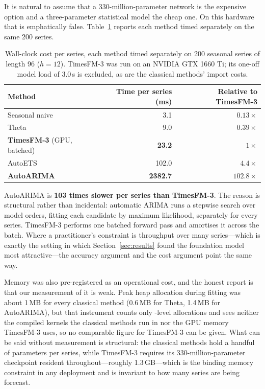 \documentclass[article]{ajs}
\providecommand{\sectionref}[1]{Section~\ref{#1}}
\providecommand{\tableref}[1]{Table~\ref{#1}}
\begin{document}
It is natural to assume that a 330-million-parameter network is the expensive option and a
three-parameter statistical model the cheap one. On this hardware that is emphatically false.
\tableref{tab:timing} reports each method timed separately on the same 200 series.

\begin{table}[t!]
\centering
\caption{Wall-clock cost per series, each method timed separately on 200 seasonal series of
length 96 ($h = 12$). TimesFM-3 was run on an NVIDIA GTX 1660 Ti; its one-off model load of
3.0\,s is excluded, as are the classical methods' import costs.}
\label{tab:timing}
\begin{tabular}{lrr}
\toprule
Method & Time per series (ms) & Relative to TimesFM-3 \\
\midrule
Seasonal naive & 3.1 & $0.13\times$ \\
Theta & 9.0 & $0.39\times$ \\
\textbf{TimesFM-3} (GPU, batched) & \textbf{23.2} & $1\times$ \\
AutoETS & 102.0 & $4.4\times$ \\
\textbf{AutoARIMA} & \textbf{2382.7} & $\mathbf{102.8\times}$ \\
\bottomrule
\end{tabular}
\end{table}

AutoARIMA is \textbf{103 times slower per series than TimesFM-3}. The reason is structural
rather than incidental: automatic ARIMA runs a stepwise search over model orders, fitting each
candidate by maximum likelihood, separately for every series. TimesFM-3 performs one batched
forward pass and amortises it across the batch. Where a practitioner's constraint is throughput
over many series---which is exactly the setting in which \sectionref{sec:results} found the
foundation model most attractive---the accuracy argument and the cost argument point the same
way.

Memory was also pre-registered as an operational cost, and the honest report is that our
measurement of it is weak. Peak  heap allocation during fitting was about 1\,MB
for every classical method (0.6\,MB for Theta, 1.4\,MB for AutoARIMA), but that instrument counts
only -level allocations and sees neither the compiled  kernels the
classical methods run in nor the GPU memory TimesFM-3 uses, so no comparable figure for TimesFM-3
can be given. What can be said without measurement is structural: the classical methods hold a
handful of parameters per series, while TimesFM-3 requires its 330-million-parameter checkpoint
resident throughout---roughly 1.3\,GB---which is the binding memory constraint in any deployment
and is invariant to how many series are being forecast.
\end{document}

